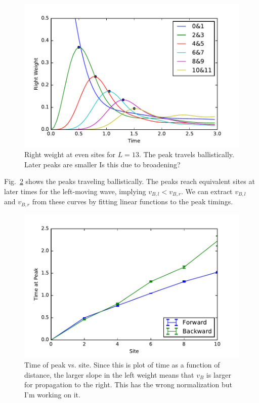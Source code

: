 \documentclass[aps,prl,reprint,superscriptaddress, longbibliography]{revtex4-1}
\newcommand{\charlie}[1]{ {\color{Magenta} {{#1}}}}
\begin{document}
\begin{figure}
	\includegraphics[width=\columnwidth]{Rweightpeakshape}
	\caption{Right weight at even sites for $L=13$. The peak travels ballistically. Later peaks are smaller \charlie{Is this due to broadening?}}
	\label{fig:Rweightpeakshape}
\end{figure}

Fig.~\ref{fig:Rweightpeaktimes} shows the peaks traveling ballistically. The peaks reach equivalent sites at later times for the left-moving wave, implying $v_{B,l}<v_{B,r}$. We can extract $v_{B,l}$ and $v_{B,r}$ from these curves by fitting linear functions to the peak timings.

\begin{figure}
	\includegraphics[width=\columnwidth]{Rweightpeaktimes}
	\caption{Time of peak vs. site. Since this is plot of time as a function of distance, the larger slope in the left weight means that $v_B$ is larger for propagation to the right. \charlie{This has the wrong normalization but I'm working on it.}}
	\label{fig:Rweightpeaktimes}
\end{figure}
\end{document}
